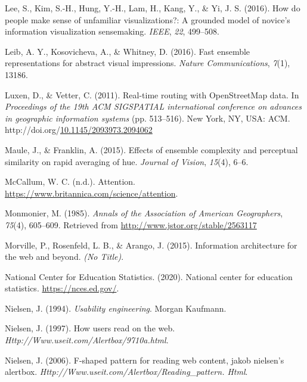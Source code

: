 \documentclass[print]{nuthesis}
\newlength{\cslhangindent}
\newenvironment{CSLReferences}[2]%
{\setlength{\parindent}{0pt}%
\everypar{\setlength{\hangindent}{\cslhangindent}}\ignorespaces}%
{\par}
\begin{document}
\begin{CSLReferences}{1}{0}
\leavevmode{}%
Lee, S., Kim, S.-H., Hung, Y.-H., Lam, H., Kang, Y., \& Yi, J. S. (2016). How do people make sense of unfamiliar visualizations?: A grounded model of novice's information visualization sensemaking. \emph{IEEE}, \emph{22}, 499--508.

\leavevmode{}%
Leib, A. Y., Kosovicheva, A., \& Whitney, D. (2016). Fast ensemble representations for abstract visual impressions. \emph{Nature Communications}, \emph{7}(1), 13186.

\leavevmode{}%
Luxen, D., \& Vetter, C. (2011). Real-time routing with OpenStreetMap data. In \emph{Proceedings of the 19th ACM SIGSPATIAL international conference on advances in geographic information systems} (pp. 513--516). New York, NY, USA: ACM. http://doi.org/\href{https://doi.org/10.1145/2093973.2094062}{10.1145/2093973.2094062}

\leavevmode{}%
Maule, J., \& Franklin, A. (2015). Effects of ensemble complexity and perceptual similarity on rapid averaging of hue. \emph{Journal of Vision}, \emph{15}(4), 6--6.

\leavevmode{}%
McCallum, W. C. (n.d.). Attention. \url{https://www.britannica.com/science/attention}.

\leavevmode{}%
Monmonier, M. (1985). \emph{Annals of the Association of American Geographers}, \emph{75}(4), 605--609. Retrieved from \url{http://www.jstor.org/stable/2563117}

\leavevmode{}%
Morville, P., Rosenfeld, L. B., \& Arango, J. (2015). Information architecture for the web and beyond. \emph{(No Title)}.

\leavevmode{}%
National Center for Education Statistics. (2020). National center for education statistics. \url{https://nces.ed.gov/}.

\leavevmode{}%
Nielsen, J. (1994). \emph{Usability engineering}. Morgan Kaufmann.

\leavevmode{}%
Nielsen, J. (1997). How users read on the web. \emph{Http://Www.useit.com/Alertbox/9710a.html}.

\leavevmode{}%
Nielsen, J. (2006). F-shaped pattern for reading web content, jakob nielsen's alertbox. \emph{Http://Www.useit.com/Alertbox/Reading\_pattern. Html}.


\end{CSLReferences}
\end{document}
